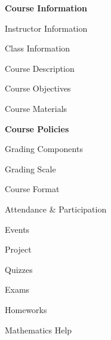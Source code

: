 \documentclass[11pt,letterpaper]{article}
\begin{document}
\mytitle




\begin{minipage}[t]{0.45\textwidth}
{\bfseries\color{stacred} Course Information} \dotfill \pageref{course_info} \par
\hspace{0.3cm} Instructor Information \dotfill \pageref{instr_info} \par
\hspace{0.3cm} Class Information \dotfill \pageref{class_info} \par
\hspace{0.3cm} Course Description \dotfill \pageref{course_desc} \par
\hspace{0.3cm} Course Objectives \dotfill \pageref{course_obj} \par
\hspace{0.3cm} Course Materials \dotfill \pageref{course_mat} \par
{\bfseries\color{stacred} Course Policies} \dotfill \pageref{course_polc} \par
\hspace{0.3cm} Grading Components \dotfill \pageref{grade_comp} \par
\hspace{0.3cm} Grading Scale \dotfill \pageref{grade_scale} \par
\hspace{0.3cm} Course Format \dotfill \pageref{course_form} \par
\hspace{0.3cm} Attendance \& Participation \dotfill \pageref{attend} \par
\hspace{0.3cm} Events \dotfill \pageref{events} \par
\hspace{0.3cm} Project \dotfill \pageref{project} \par
\hspace{0.3cm} Quizzes \dotfill \pageref{quiz} \par
\hspace{0.3cm} Exams \dotfill \pageref{exams} \par
\hspace{0.3cm} Homeworks \dotfill \pageref{hw} \par
\hspace{0.3cm} Mathematics Help \dotfill \pageref{help} \par

\end{minipage}
\end{document}
